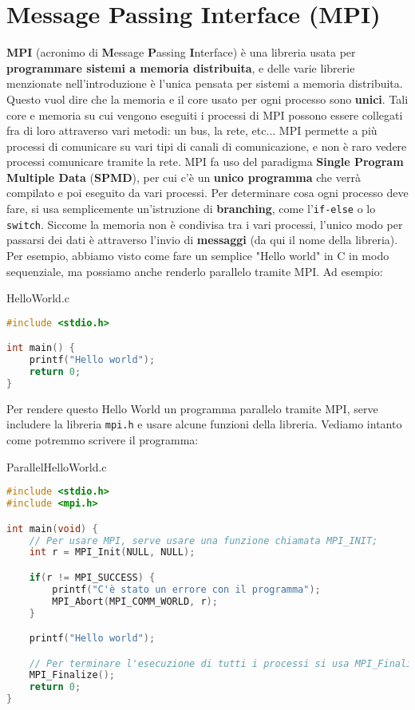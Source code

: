 \chapter{Message Passing Interface (MPI)}
\textbf{MPI} (acronimo di \textbf{M}essage \textbf{P}assing \textbf{I}nterface) è una libreria usata per \textbf{programmare sistemi a memoria distribuita}, e delle varie librerie menzionate nell'introduzione è l'unica pensata per sistemi a memoria distribuita. Questo vuol dire che la memoria e il core usato per ogni processo sono \textbf{unici}. Tali core e memoria su cui vengono eseguiti i processi di MPI possono essere collegati fra di loro attraverso vari metodi: un bus, la rete, etc... MPI permette a più processi di comunicare su vari tipi di canali di comunicazione, e non è raro vedere processi comunicare tramite la rete.
\nwl
MPI fa uso del paradigma \textbf{Single Program Multiple Data} (\textbf{SPMD}), per cui c'è un \textbf{unico programma} che verrà compilato e poi eseguito da vari processi. Per determinare cosa ogni processo deve fare, si usa semplicemente un'istruzione di \textbf{branching}, come l'\texttt{if-else} o lo \texttt{switch}.
\nwl
Siccome la memoria non è condivisa tra i vari processi, l'unico modo per passarsi dei dati è attraverso l'invio di \textbf{messaggi} (da qui il nome della libreria). Per esempio, abbiamo visto come fare un semplice "Hello world" in C in modo sequenziale, ma possiamo anche renderlo parallelo tramite MPI. Ad esempio:
\begin{codeblock}{HelloWorld.c}
    \begin{lstlisting}[language = C]
#include <stdio.h>

int main() {
    printf("Hello world");
    return 0;
}\end{lstlisting}
\end{codeblock}
Per rendere questo Hello World un programma parallelo tramite MPI, serve includere la libreria \texttt{mpi.h} e usare alcune funzioni della libreria. Vediamo intanto come potremmo scrivere il programma:

\begin{codeblock}{ParallelHelloWorld.c}
    \begin{lstlisting}[language = C]
#include <stdio.h>
#include <mpi.h>

int main(void) {
    // Per usare MPI, serve usare una funzione chiamata MPI_INIT;
    int r = MPI_Init(NULL, NULL);

    if(r != MPI_SUCCESS) {
        printf("C'è stato un errore con il programma");
        MPI_Abort(MPI_COMM_WORLD, r);
    }

    printf("Hello world");

    // Per terminare l'esecuzione di tutti i processi si usa MPI_Finalize
    MPI_Finalize();
    return 0;
}\end{lstlisting}
\end{codeblock}

